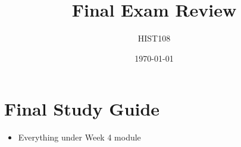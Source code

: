 \documentclass{article}
\title{Final Exam Review}
\author{HIST108}
\date{\today}
\begin{document}
\maketitle

\section*{Final Study Guide}
\begin{itemize}
  \item Everything under Week 4 module
\end{itemize}
\end{document}
